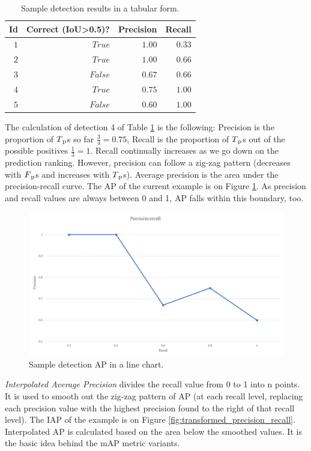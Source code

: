 \begin{table}[htb]
\caption{Sample detection results in a tabular form.}
\label{tab:sample_detection}
\noindent
\centering
\begin{tabular*}
{\columnwidth}{@{\extracolsep{\stretch{1}}}*{4}{r}@{}}
    Id & Correct (IoU>0.5)? & Precision & Recall\\ \hline
    $1$ & $True$ & $1.00$ & $0.33$ \\
    $2$ & $True$ & $1.00$ & $0.66$ \\
    $3$ & $False$ & $0.67$ & $0.66$ \\
    $4$ & $True$ & $0.75$ & $1.00$ \\
    $5$ & $False$ & $0.60$ & $1.00$ \\          
\end{tabular*}
\end{table}

The calculation of detection 4 of Table \ref{tab:sample_detection} is the following: Precision is the proportion of  \(T\textsubscript{p}\)s so far \(\frac{3}{4}=0.75\), Recall is the proportion of  \(T\textsubscript{p}\)s out of the possible positives \(\frac{1}{3}=1\). Recall continually increases as we go down on the prediction ranking. However, precision can follow a zig-zag pattern (decreases with  \(F\textsubscript{p}\)s and increases with \(T\textsubscript{p}\)s). Average precision is the area under the precision-recall curve. The AP of the current example is on Figure \ref{fig:precision_recall}. As precision and recall values are always between 0 and 1, AP falls within this boundary, too.

\begin{figure}[htb]
 \centerline{\includegraphics[width=0.8\columnwidth]{.//Figure/Detector/precision_recall.png}}
 \caption{Sample detection AP in a line chart.}
 \label{fig:precision_recall}
\end{figure}

\textit{Interpolated Average Precision} divides the recall value from 0 to 1 into n points. It is used to smooth out the zig-zag pattern of AP (at each recall level, replacing each precision value with the highest precision found to the right of that recall level\cite{IntroInfoRetrieval}). The IAP of the example is on Figure \ref{fig:transformed_precision_recall}. Interpolated AP is calculated based on the area below the smoothed values. It is the basic idea behind the mAP metric variants.

